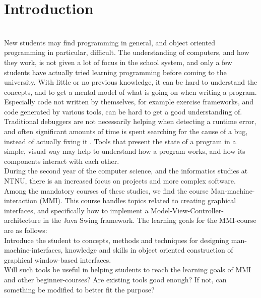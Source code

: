 \section{Introduction}\label{introduction}
~\\
New students may find programming in general, and object oriented programming in particular, difficult.
The understanding of computers, and how they work, is not given a lot of focus in the school system, and only a few students have actually tried learning programming before coming to the university.
With little or no previous knowledge, it can be hard to understand the concepts, and to get a mental model of what is going on when writing a program.
Especially code not written by themselves, for example exercise frameworks, and code generated by various tools, can be hard to get a good understanding of.
Traditional debuggers are not necessarily helping when detecting a runtime error, and often significant amounts of time is spent searching for the cause of a bug, instead of actually fixing it \cite{ko2006}.
Tools that present the state of a program in a simple, visual way may help to understand how a program works, and how its components interact with each other.
~\\

During the second year of the computer science, and  the informatics studies at NTNU, there is an increased focus on projects and more complex software.
Among the mandatory courses of these studies, we find the course Man-machine-interaction (MMI).
This course handles topics related to creating graphical interfaces, and specifically how to implement a Model-View-Controller-architecture in the Java Swing framework.
The learning goals for the MMI-course are as follows:\\
Introduce the student to concepts, methods and techniques for designing man-machine-interfaces, knowledge and skills in object oriented construction of graphical window-based interfaces.
~\\

Will such tools be useful in helping students to reach the learning goals of MMI and other beginner-courses?
Are existing tools good enough?
If not, can something be modified to better fit the purpose?